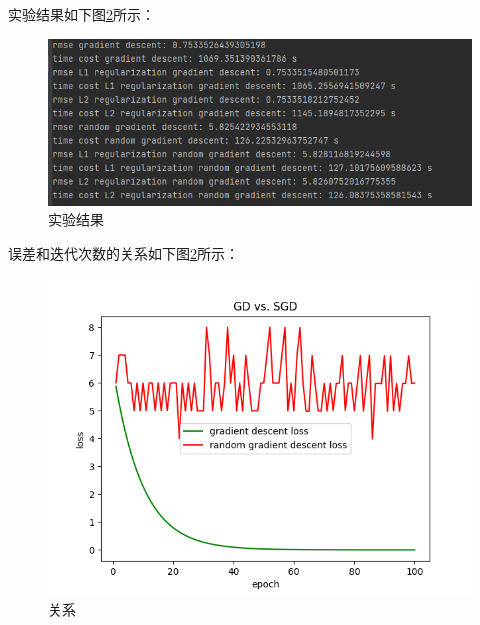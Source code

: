 \documentclass[UTF8,a4paper,10pt]{ctexart}
\begin{document}
实验结果如下图\ref{fig:1}所示：

\begin{figure}[H]
    \centering
    \includegraphics[scale=0.7]{5.png}
    \caption{实验结果}
    \label{fig:1}
\end{figure}

误差和迭代次数的关系如下图\ref{fig:1}所示：

\begin{figure}[H]
    \centering
    \includegraphics[scale=0.5]{4.png}
    \caption{关系}
    \label{fig:1}
\end{figure}








\end{document}

